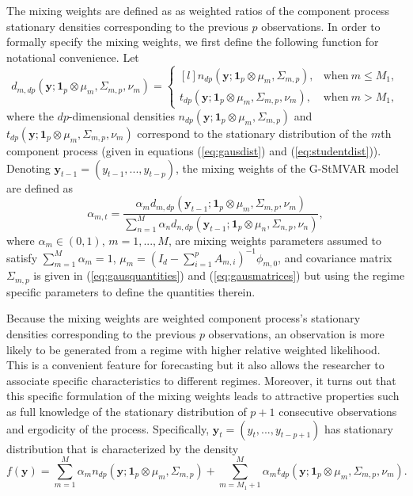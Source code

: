 \documentclass[nojss]{jss} %
\begin{document}
The mixing weights are defined as as weighted ratios of the component process stationary densities corresponding to the previous $p$ observations. In order to formally specify the mixing weights,  we first define the following function for notational convenience. Let
\begin{equation}\label{eq:d_mdp}
d_{m,dp}(\boldsymbol{y};\mathbf{1}_p\otimes\mu_m,\Sigma_{m,p},\nu_m)=
\left\{\begin{matrix*}[l]
 n_{dp}(\boldsymbol{y};\mathbf{1}_p\otimes\mu_m,\Sigma_{m,p}), & \text{when} \ m \leq M_1, \\
 t_{dp}(\boldsymbol{y};\mathbf{1}_p\otimes\mu_m,\Sigma_{m,p},\nu_m), & \text{when} \ m > M_1,
\end{matrix*}\right.
\end{equation}
where the $dp$-dimensional densities $n_{dp}(\boldsymbol{y};\mathbf{1}_p\otimes\mu_m,\Sigma_{m,p})$ and $t_{dp}(\boldsymbol{y};\mathbf{1}_p\otimes\mu_m,\Sigma_{m,p},\nu_m)$ correspond to the stationary distribution of the $m$th component process (given in equations (\ref{eq:gausdist}) and (\ref{eq:studentdist})).  Denoting $\boldsymbol{y}_{t-1}=(y_{t-1},...,y_{t-p})$, the mixing weights of the G-StMVAR model are defined as
\begin{equation}\label{eq:alpha_mt}
\alpha_{m,t} = \frac{\alpha_md_{m,dp}(\boldsymbol{y}_{t-1};\mathbf{1}_p\otimes\mu_m,\Sigma_{m,p},\nu_m)}{\sum_{n=1}^M \alpha_n d_{n,dp}(\boldsymbol{y}_{t-1};\mathbf{1}_p\otimes\mu_n,\Sigma_{n,p},\nu_n)},
\end{equation}
where $\alpha_m\in (0,1)$, $m=1,...,M$, are mixing weights parameters assumed to satisfy $\sum_{m=1}^M\alpha_m = 1$,  $\mu_m = (I_d - \sum_{i=1}^pA_{m,i})^{-1}\phi_{m,0}$,  and covariance matrix $\Sigma_{m,p}$ is given in (\ref{eq:gausquantities}) and (\ref{eq:gausmatrices}) but using the regime specific parameters to define the quantities therein.

Because the mixing weights are weighted component process's stationary densities corresponding to the previous $p$ observations,  an observation is more likely to be generated from a regime with higher relative weighted likelihood.  This is a convenient feature for forecasting but it also allows the researcher to associate specific characteristics to different regimes.  Moreover,  it turns out that this specific formulation of the mixing weights leads to attractive properties such as full knowledge of the stationary distribution of $p+1$ consecutive observations and ergodicity of the process. Specifically,  $\boldsymbol{y}_t=(y_t,...,y_{t-p+1})$ has stationary distribution that is characterized by the density \citep[Theorem 2]{Virolainen2:2021}
\begin{equation}
f(\boldsymbol{y}) = \sum_{m=1}^M\alpha_m n_{dp}(\boldsymbol{y};\boldsymbol{1}_p\otimes\mu_{m},\Sigma_{m,p}) + \sum_{m=M_1+1}^M\alpha_mt_{dp}(\boldsymbol{y};\boldsymbol{1}_p\otimes\mu_{m},\Sigma_{m,p},\nu_m).
\end{equation}
\end{document}
